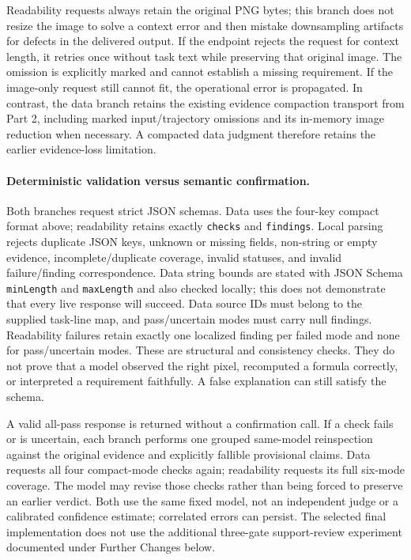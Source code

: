 \documentclass[11pt]{article}
\begin{document}
Readability requests always retain the original PNG bytes; this branch
does not resize the image to solve a context error and then mistake
downsampling artifacts for defects in the delivered output.
If the endpoint rejects the request for context length, it retries once
without task text while preserving that original image. The omission
is explicitly marked and cannot establish a missing requirement.
If the image-only request still cannot fit, the operational error is
propagated. In contrast, the data branch retains the existing evidence
compaction transport from Part 2, including marked input/trajectory
omissions and its in-memory image reduction when necessary. A compacted
data judgment therefore retains the earlier evidence-loss limitation.

\paragraph{Deterministic validation versus semantic confirmation.}
Both branches request strict JSON schemas. Data uses the four-key compact
format above; readability retains exactly \texttt{checks} and
\texttt{findings}. Local parsing rejects duplicate JSON keys, unknown or
missing fields, non-string or empty evidence, incomplete/duplicate
coverage, invalid statuses, and invalid failure/finding correspondence.
Data string bounds are stated with JSON Schema \texttt{minLength} and
\texttt{maxLength} and also checked locally; this does not demonstrate
that every live response will succeed. Data source IDs must belong
to the supplied task-line map, and pass/uncertain modes must carry null
findings. Readability failures retain exactly one localized finding per
failed mode and none for pass/uncertain modes. These are structural and
consistency checks. They do not prove that a model observed the right
pixel, recomputed a formula correctly, or interpreted a requirement
faithfully. A false explanation can still satisfy the schema.

A valid all-pass response is returned without a confirmation call.
If a check fails or is uncertain, each branch performs one grouped
same-model reinspection against the original evidence and explicitly
fallible provisional claims. Data requests all four compact-mode checks
again; readability requests its full six-mode coverage. The model may
revise those checks rather than being forced to preserve an earlier
verdict. Both use the same fixed model, not an independent judge or a
calibrated confidence estimate; correlated errors can persist.
The selected final implementation does not use the additional three-gate
support-review experiment documented under Further Changes below.
\end{document}
